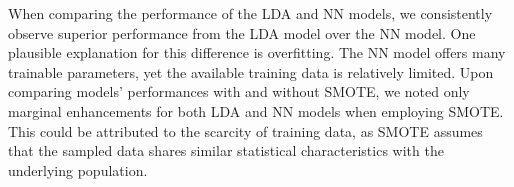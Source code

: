 \documentclass[journal]{IEEEtran}
\begin{document}
\par
When comparing the performance of the LDA and NN models, we consistently observe superior performance from the LDA model over the NN model. One plausible explanation for this difference is overfitting. The NN model offers many trainable parameters, yet the available training data is relatively limited. Upon comparing models' performances with and without SMOTE, we noted only marginal enhancements for both LDA and NN models when employing SMOTE. This could be attributed to the scarcity of training data, as SMOTE assumes that the sampled data shares similar statistical characteristics with the underlying population.

\end{document}
